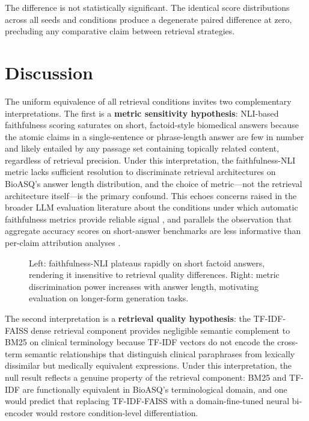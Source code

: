 \documentclass{article}
\begin{document}
The difference is not statistically significant. The identical score distributions across all seeds and conditions produce a degenerate paired difference at zero, precluding any comparative claim between retrieval strategies.

\section{Discussion}

\label{sec:discussion}

The uniform equivalence of all retrieval conditions invites two complementary interpretations. The first is a \textbf{metric sensitivity hypothesis}: NLI-based faithfulness scoring saturates on short, factoid-style biomedical answers because the atomic claims in a single-sentence or phrase-length answer are few in number and likely entailed by any passage set containing topically related content, regardless of retrieval precision. Under this interpretation, the faithfulness-NLI metric lacks sufficient resolution to discriminate retrieval architectures on BioASQ's answer length distribution, and the choice of metric---not the retrieval architecture itself---is the primary confound. This echoes concerns raised in the broader LLM evaluation literature about the conditions under which automatic faithfulness metrics provide reliable signal \cite{feuerriegel2023generative}, and parallels the observation that aggregate accuracy scores on short-answer benchmarks are less informative than per-claim attribution analyses \cite{singhal2023large}.

\begin{figure}[t]
\centering

\caption{Left: faithfulness-NLI plateaus rapidly on short factoid answers, rendering it insensitive to retrieval quality differences. Right: metric discrimination power increases with answer length, motivating evaluation on longer-form generation tasks.}
\label{fig:metric_saturation}
\end{figure}

The second interpretation is a \textbf{retrieval quality hypothesis}: the TF-IDF-FAISS dense retrieval component provides negligible semantic complement to BM25 on clinical terminology because TF-IDF vectors do not encode the cross-term semantic relationships that distinguish clinical paraphrases from lexically dissimilar but medically equivalent expressions. Under this interpretation, the null result reflects a genuine property of the retrieval component: BM25 and TF-IDF are functionally equivalent in BioASQ's terminological domain, and one would predict that replacing TF-IDF-FAISS with a domain-fine-tuned neural bi-encoder would restore condition-level differentiation.
\end{document}
